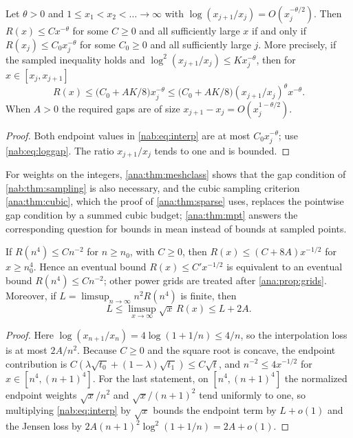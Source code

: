 \begin{theorem}\label{nab:thm:sampling}
Let $\theta>0$ and $1\le x_1<x_2<\dots\to\infty$ with
$\log(x_{j+1}/x_j)=O(x_j^{-\theta/2})$. Then $R(x)\le Cx^{-\theta}$ for some $C\ge0$ and all
sufficiently large $x$ if and only if $R(x_j)\le C_0x_j^{-\theta}$ for some $C_0\ge0$ and
all sufficiently large $j$. More precisely, if the sampled inequality holds and
$\log^2(x_{j+1}/x_j)\le Kx_j^{-\theta}$, then for $x\in[x_j,x_{j+1}]$
\[
 R(x)\le\bigl(C_0+AK/8\bigr)x_j^{-\theta}\le\bigl(C_0+AK/8\bigr)(x_{j+1}/x_j)^\theta x^{-\theta}.
\]
When $A>0$ the required gaps are of size $x_{j+1}-x_j=O(x_j^{1-\theta/2})$.
\end{theorem}
\begin{proof}
Both endpoint values in \eqref{nab:eq:interp} are at most $C_0x_j^{-\theta}$; use
\eqref{nab:eq:loggap}. The ratio $x_{j+1}/x_j$ tends to one and is bounded.
\end{proof}

For weights on the integers, \cref{ana:thm:meshclass} shows that the gap condition of
\cref{nab:thm:sampling} is also necessary, and the cubic sampling criterion
\cref{ana:thm:cubic}, which the proof of \cref{ana:thm:sparse} uses, replaces the pointwise
gap condition by a summed cubic budget; \cref{ana:thm:mpt} answers the corresponding question
for bounds in mean instead of bounds at sampled points.

\begin{corollary}\label{nab:cor:quartic}
If $R(n^4)\le Cn^{-2}$ for $n\ge n_0$, with $C\ge0$, then $R(x)\le(C+8A)x^{-1/2}$ for
$x\ge n_0^4$. Hence an eventual bound $R(x)\le C'x^{-1/2}$ is equivalent to an eventual
bound $R(n^4)\le Cn^{-2}$; other power grids are treated after \cref{ana:prop:grids}. Moreover, if $L=\limsup_{n\to\infty}n^2R(n^4)$ is finite, then
\[
 L\le\limsup_{x\to\infty}\sqrt x\,R(x)\le L+2A .
\]
\end{corollary}
\begin{proof}
Here $\log(x_{n+1}/x_n)=4\log(1+1/n)\le4/n$, so the interpolation loss is at most $2A/n^2$.
Because $C\ge0$ and the square root is concave, the endpoint contribution is
$C(\lambda\sqrt{t_0}+(1-\lambda)\sqrt{t_1})\le C\sqrt t$, and $n^{-2}\le4x^{-1/2}$ for
$x\in[n^4,(n+1)^4]$. For the last statement, on $[n^4,(n+1)^4]$ the normalized endpoint
weights $\sqrt x/n^2$ and $\sqrt x/(n+1)^2$ tend uniformly to one, so multiplying
\eqref{nab:eq:interp} by $\sqrt x$ bounds the endpoint term by $L+o(1)$ and the Jensen
loss by $2A(n+1)^2\log^2(1+1/n)=2A+o(1)$.
\end{proof}

